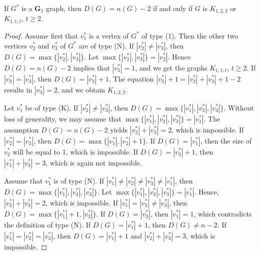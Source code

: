 \documentclass[10pt,a4paper]{amsart}
\begin{document}
\begin{lemma}\label{G1}
If $G^{\ast}$ is a {\bf G}$_1$ graph, then $D(G) =n(G)-2$ if and only if $G$ is $K_{1, 2, 2}$ or $K_{1, 1, t}$, $t\geq 2$. 
\end{lemma}

\begin{proof} 
Assume first that  $v^{\ast}_1$ is a vertex of $G^{\ast}$ of type (1). Then the other two vertices $v^{\ast}_2$ and $v^{\ast}_3$ of $G^{\ast}$ are of type (N). If 
$|v^{\ast}_2|\neq |v^{\ast}_3|$, then $D(G)=\max \{|v^{\ast}_2|, |v^{\ast}_3|\}$. 
Let $\max \{|v^{\ast}_2|, |v^{\ast}_3|\}=|v^{\ast}_2|$. 
Hence $D(G)=n(G)-2$ implies that $|v^{\ast}_3|=1$, and we get the graphs $K_{1, 1, t}$, $t\geq 2$.  
If $|v^{\ast}_2|=|v^{\ast}_3|$, then $D(G)=|v^{\ast}_2|+1$. 
The equation $|v^{\ast}_2|+1=|v^{\ast}_2|+|v^{\ast}_3|+1-2$ 
results in $|v^{\ast}_3|=2$, and we obtain $K_{1, 2, 2}$. 

Let $v^{\ast}_1$ be of type (K). 
If $|v^{\ast}_2|\neq |v^{\ast}_3|$, then $D(G)=\max \{|v^{\ast}_1|, |v^{\ast}_2|, |v^{\ast}_3|\}$. Without loss of generality, we may assume that 
$\max \{|v^{\ast}_1|, |v^{\ast}_2|, |v^{\ast}_3|\}=|v^{\ast}_1|$. 
The assumption $D(G)=n(G)-2$ yields $|v^{\ast}_2|+|v^{\ast}_3|=2$, 
which is impossible. 
If $|v^{\ast}_2|= |v^{\ast}_3|$, 
then $D(G)=\max \{|v^{\ast}_1|, |v^{\ast}_2|+1\}$. 
If $D(G)=|v^{\ast}_1|$, then the size of $v^{\ast}_2$ will be equal to 1, which is impossible. 
If $D(G)=|v^{\ast}_2|+1$, then $|v^{\ast}_1| + |v^{\ast}_3|=3$, which is again not impossible.

Assume that $v^{\ast}_1$ is of type (N). 
If $|v^{\ast}_1|\neq |v^{\ast}_2|\neq |v^{\ast}_3| \neq |v^{\ast}_1|$, 
then $D(G)=\max \{|v^{\ast}_1|, |v^{\ast}_2|, |v^{\ast}_3|\}$. 
Let $\max \{|v^{\ast}_1|, |v^{\ast}_2|, |v^{\ast}_3|\}=|v^{\ast}_1|$. 
Hence, $|v^{\ast}_2|+|v^{\ast}_3|=2$, which is impossible.  
If $|v^{\ast}_1|=|v^{\ast}_2|\neq |v^{\ast}_3|$, then
$D(G)=\max \{|v^{\ast}_1|+1, |v^{\ast}_3|\}$. 
If $D(G)=|v^{\ast}_3|$, then $|v^{\ast}_1| =1$, 
which contradicts the definition of type (N).
If $D(G)=|v^{\ast}_1|+1$, then $D(G)\neq n-2$. If $|v^{\ast}_1|=|v^{\ast}_2|= |v^{\ast}_3|$,  then
$D(G)=|v^{\ast}_1|+1$ and $|v^{\ast}_2|+|v^{\ast}_3|=3$, which is impossible.
\end{proof}
\end{document}
